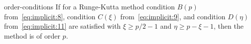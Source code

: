 \begin{Theorem}{order-conditions}
  If for a Runge-Kutta method condition $B(p)$
  from~\eqref{eq:implicit:8}, condition $C(\xi)$
  from~\eqref{eq:implicit:9}, and condition $D(\eta)$
  from~\eqref{eq:implicit:11} are satisfied with $\xi\ge p/2-1$ and
  $\eta \ge p-\xi-1$, then the method is of order $p$.
\end{Theorem}

